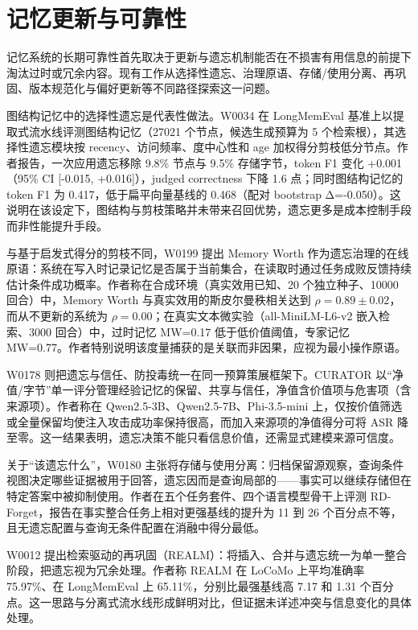 \section{记忆更新与可靠性}



记忆系统的长期可靠性首先取决于更新与遗忘机制能否在不损害有用信息的前提下淘汰过时或冗余内容。现有工作从选择性遗忘、治理原语、存储/使用分离、再巩固、版本规范化与偏好更新等不同路径探索这一问题。

图结构记忆中的选择性遗忘是代表性做法。W0034 在 LongMemEval 基准上以提取式流水线评测图结构记忆（27021 个节点，候选生成预算为 5 个检索根），其选择性遗忘模块按 recency、访问频率、度中心性和 age 加权得分剪枝低分节点。作者报告，一次应用遗忘移除 9.8\% 节点与 9.5\% 存储字节，token F1 变化 +0.001（95\% CI [-0.015, +0.016]），judged correctness 下降 1.6 点；同时图结构记忆的 token F1 为 0.417，低于扁平向量基线的 0.468（配对 bootstrap Δ=-0.050）\cite{W0034}。这说明在该设定下，图结构与剪枝策略并未带来召回优势，遗忘更多是成本控制手段而非性能提升手段。

与基于启发式得分的剪枝不同，W0199 提出 Memory Worth 作为遗忘治理的在线原语：系统在写入时记录记忆是否属于当前集合，在读取时通过任务成败反馈持续估计条件成功概率。作者称在合成环境（真实效用已知、20 个独立种子、10000 回合）中，Memory Worth 与真实效用的斯皮尔曼秩相关达到 $\rho=0.89\pm0.02$，而从不更新的系统为 $\rho=0.00$；在真实文本微实验（all-MiniLM-L6-v2 嵌入检索、3000 回合）中，过时记忆 MW=0.17 低于低价值阈值，专家记忆 MW=0.77。作者特别说明该度量捕获的是关联而非因果，应视为最小操作原语\cite{W0199}。

W0178 则把遗忘与信任、防投毒统一在同一预算策展框架下。CURATOR 以“净值/字节”单一评分管理经验记忆的保留、共享与信任，净值含价值项与危害项（含来源项）。作者称在 Qwen2.5-3B、Qwen2.5-7B、Phi-3.5-mini 上，仅按价值筛选或全量保留均使注入攻击成功率保持很高，而加入来源项的净值得分可将 ASR 降至零\cite{W0178}。这一结果表明，遗忘决策不能只看信息价值，还需显式建模来源可信度。

关于“该遗忘什么”，W0180 主张将存储与使用分离：归档保留源观察，查询条件视图决定哪些证据被用于回答，遗忘因而是查询局部的——事实可以继续存储但在特定答案中被抑制使用。作者在五个任务套件、四个语言模型骨干上评测 RD-Forget，报告在事实整合任务上相对更强基线的提升为 11 到 26 个百分点不等，且无遗忘配置与查询无条件配置在消融中得分最低\cite{W0180}。

W0012 提出检索驱动的再巩固（REALM）：将插入、合并与遗忘统一为单一整合阶段，把遗忘视为冗余处理。作者称 REALM 在 LoCoMo 上平均准确率 75.97\%、在 LongMemEval 上 65.11\%，分别比最强基线高 7.17 和 1.31 个百分点\cite{W0012}。这一思路与分离式流水线形成鲜明对比，但证据未详述冲突与信息变化的具体处理。

